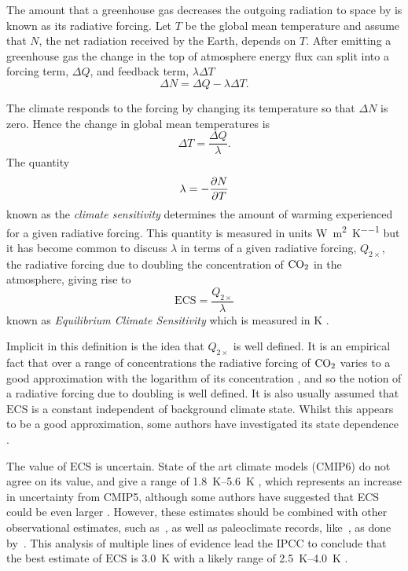 The amount that a greenhouse gas decreases the outgoing radiation to space by is known as its radiative forcing. Let $T$ be
the global mean temperature and assume that $N$, the net radiation received by the Earth, depends on $T$. After emitting a greenhouse gas
the change in the top of atmosphere energy flux can split \parencite{Gregory2004} into a forcing term, $\Delta Q$, and feedback term, $\lambda \Delta T$
\begin{equation}
  \label{eq:deltaN}
  \Delta N = \Delta Q - \lambda \Delta T.
\end{equation}

The climate responds to the forcing by changing its temperature so that $\Delta N$ is zero. Hence the change in global mean temperatures is
\begin{equation}
  \label{eq:response_to_radiative_forcing}
  \Delta T = \frac{\Delta Q}{\lambda}.
\end{equation}
The quantity
\begin{equation}
  \label{eq:climate_sensitivity}
  \lambda = -\pdv{N}{T}
\end{equation}
known as the \emph{climate sensitivity} determines the amount of warming experienced for a given radiative forcing. This quantity is measured
in units \si{\watt\per\square\meter\per\kelvin} but it has become common to discuss $\lambda$ in terms of a given radiative forcing, $Q_{2\times}$,
the radiative forcing due to doubling the concentration of $\ce{CO2}$ in the atmosphere, giving rise to
\begin{equation}
  \label{eq:definition_of_ECS}
  \mathrm{ECS} = \frac{Q_{2\times}}{\lambda}
\end{equation}
known as \emph{Equilibrium Climate Sensitivity} which is measured in \si{\kelvin} \parencite{Charney1979}.

Implicit in this definition is the idea that $Q_{2\times}$ is well defined. It is an empirical fact that over a range of concentrations the radiative forcing
of $\ce{CO2}$ varies to a good approximation with the logarithm of its concentration \parencite{Pierrehumbert2010}, and so the notion of a radiative forcing due to doubling is well defined.
It is also usually assumed that $\mathrm{ECS}$ is a constant independent of background climate state. Whilst this appears to be a good approximation, some authors
have investigated its state dependence \parencite{Ashwin2019,Caballero2013,Bloch-Johnson2021}.

The value of $\mathrm{ECS}$ is uncertain. State of the art climate models (CMIP6) do not agree on its value, and give a range of
\SIrange{1.8}{5.6}{\kelvin} \parencite{Zelinka2020}, which represents an increase in uncertainty from CMIP5, although some authors have suggested that ECS could be even
larger \parencite{Stainforth2005}.
However, these estimates should be combined with other observational estimates, such as~\cite{Cox2018}, as well as paleoclimate records, like~\cite{Hargreaves2012}, as done by~\cite{Sherwood2020}.
This analysis of multiple lines of evidence lead the IPCC to conclude that the best estimate of $\mathrm{ECS}$ is \SI{3.0}{\kelvin} with a likely range of \SIrange{2.5}{4.0}{\kelvin} \parencite{AR6}.

